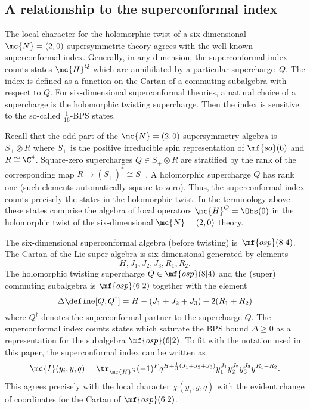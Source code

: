 
\subsection{A relationship to the superconformal index}
\label{sec:sucaindex}
The local character for the holomorphic twist of a six-dimensional $\mc{N}=(2,0)$ supersymmetric theory agrees with the well-known superconformal index.
Generally, in any dimension, the superconformal index counts states $\mc{H}^Q$ which are annihilated by a particular supercharge~$Q$.
The index is defined as a function on the Cartan of a commuting subalgebra with respect to $Q$.
For six-dimensional superconformal theories, a natural choice of a supercharge is the holomorphic twisting supercharge. 
Then the index is sensitive to the so-called $\tfrac{1}{16}$-BPS states.

Recall that the odd part of the $\mc{N}=(2,0)$ supersymmetry algebra is $S_+ \otimes R$ where $S_+$ is the positive irreducible spin representation of $\mf{so}(6)$ and $R \cong \C^4$.
Square-zero supercharges $Q \in S_+ \otimes R$ are stratified by the rank of the corresponding map $R \to (S_+)^* \cong S_-$.
A holomorphic supercharge $Q$ has rank one (such elements automatically square to zero). 
Thus, the superconformal index counts precisely the states in the holomorphic twist.
In the terminology above these states comprise the algebra of local operators $\mc{H}^Q = \Obs(0)$ in the holomorphic twist of the six-dimensional $\mc{N}=(2,0)$ theory.

The six-dimensional superconformal algebra (before twisting) is~$\mf{osp}(8|4)$.
The Cartan of the Lie super algebra is six-dimensional generated by elements
\[
H, J_1,J_2,J_3,R_1,R_2 .
\]
The holomorphic twisting supercharge $Q \in \mf{osp}(8|4)$ and the (super) commuting subalgebra is $\mf{osp}(6|2)$ together with the element 
\[
\Delta \define [Q,Q^\dagger] = H - (J_1 + J_2 + J_3) - 2 (R_1 + R_2) 
\]
where $Q^\dagger$ denotes the superconformal partner to the supercharge $Q$. 
The superconformal index counts states which saturate the BPS bound $\Delta \geq 0$ as a representation for the subalgebra $\mf{osp}(6|2)$. 
To fit with the notation used in this paper, the superconformal index can be written as
\begin{equation}
\mc{I}(y_i,y,q) = \tr_{\mc{H}^Q} (-1)^F q^{H + \frac13 (J_1+J_2+J_3)} y_1^{J_1} y_2^{J_2} y_3^{J_3} y^{R_1 - R_2} .
\end{equation}
This agrees precisely with the local character $\chi(y_i,y,q)$ with the evident change of coordinates for the Cartan of $\mf{osp}(6|2)$. 

